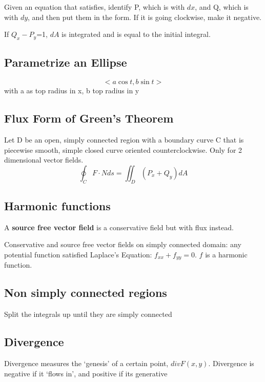 Given an equation that satisfies, identify P, which is with $dx$, and Q, which is with $dy$, and then put them in the form. If it is going clockwise, make it negative.

\hfill

If $Q_{x}-P_{y}$=1, $dA$ is integrated and is equal to the initial integral.

\hfill
\hfill

\subsection{Parametrize an Ellipse}
\begin{equation}
	\label{}
<a\cos t,b\sin t>	
\end{equation}
with a as top radius in x, b top radius in y

\subsection{Flux Form of Green's Theorem}

Let D be an open, simply connected region with a boundary curve C that is piecewise smooth, simple closed curve oriented counterclockwise. Only for 2 dimensional vector fields.
\begin{equation}
	\label{}
\oint_{C}F\cdot N ds = \iint_{D}(P_{x}+Q_{y})dA	
\end{equation}


\subsection{Harmonic functions}

A \textbf{source free vector field} is a conservative field but with flux instead.


\hfill
\hfill

Conservative and source free vector fields on simply connected domain: any potential function satisfied Laplace's Equation: $f_{xx}+f_{yy}=0$. $f$ is a harmonic function.

\subsection{Non simply connected regions}
Split the integrals up until they are simply connected



\subsection{Divergence}
Divergence measures the `genesis' of a certain point, $div F(x,y)$. Divergence is negative if it `flows in', and positive if its generative


